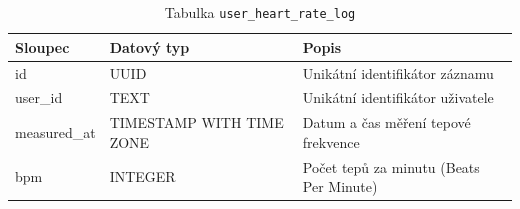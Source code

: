 \begin{table}[ht!]
    \centering
    \begin{tabularx}{\textwidth}{|l|l|L|}
        \hline
        \textbf{Sloupec} & \textbf{Datový typ}      & \textbf{Popis}                          \\ \hline
        id               & UUID                     & Unikátní identifikátor záznamu          \\ \hline
        user\_id         & TEXT                     & Unikátní identifikátor uživatele        \\ \hline
        measured\_at     & TIMESTAMP WITH TIME ZONE & Datum a čas měření tepové frekvence     \\ \hline
        bpm              & INTEGER                  & Počet tepů za minutu (Beats Per Minute) \\ \hline
    \end{tabularx}
    \caption{Tabulka \texttt{user\_heart\_rate\_log}}
    \label{tab:user_heart_rate_log}
\end{table}
